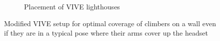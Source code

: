 \begin{figure}[ht]
\begin{subfigure}[t]{0.699\textwidth}
        \caption{Placement of VIVE lighthouses}
        \label{fig:vive-setup-solution}
    \end{subfigure}
	\captionsetup{subrefformat=parens}
    \caption[VIVE setup]{Modified VIVE setup  for optimal coverage of climbers on a wall even if they are in a typical pose  where their arms cover up the headset}
    \label{fig:vive-setup}
\end{figure}